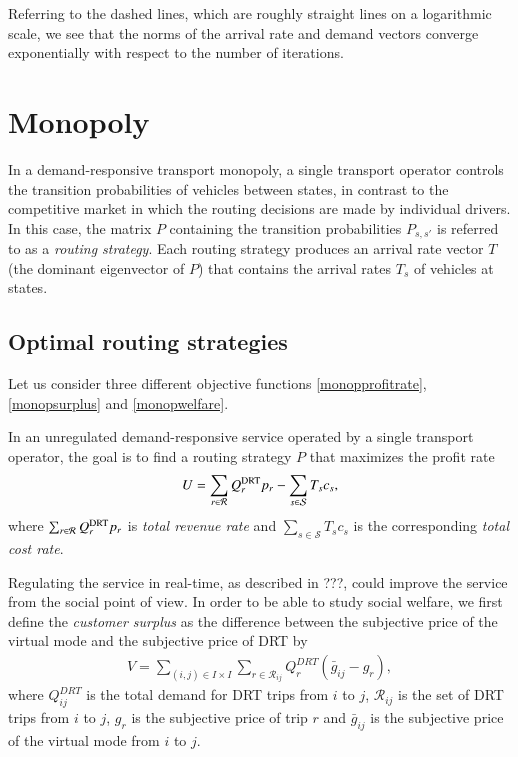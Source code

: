 \documentclass[dissertation,draft*]{aaltoseries}
\begin{document}
Referring to the dashed lines, which are roughly straight lines on a logarithmic scale, 
we see that the norms of the arrival rate and demand vectors converge exponentially
with respect to the number of iterations. 





\section{Monopoly}
\label{monopdescription}
In a demand-responsive transport monopoly, a single transport operator controls the transition probabilities of vehicles
between states, in contrast to the competitive market in which the routing decisions are made by individual drivers.
In this case, the matrix $P$ containing the transition probabilities $P_{s,s'}$ is referred to as a \emph{routing strategy}.
Each routing strategy produces an arrival rate vector $T$ (the dominant eigenvector of $P$) that contains the arrival rates $T_s$ of
vehicles at states.

\subsection{Optimal routing strategies}
Let us consider three different objective functions \eqref{monopprofitrate}, \eqref{monopsurplus} and \eqref{monopwelfare}.

In an unregulated demand-responsive service operated by a single transport operator, 
the goal is to find a routing strategy $P$ that maximizes the profit rate
\begin{align}
\label{monopprofitrate}
U = \sum_{r \in \mathcal{R}}  Q_r^{\rm DRT} p_r - \sum_{s \in \mathcal{S}} T_s c_{s},
\end{align}
where $\sum_{r \in \mathcal{R}}  Q_r^{\rm DRT} p_r$ is \emph{total revenue rate} 
and $\sum_{s \in \mathcal{S}} T_s c_{s}$ is
the corresponding \emph{total cost rate}. 

Regulating the service in real-time, as described in ???, could improve the service
from the social point of view. In order to be able to study social welfare, we first define the \emph{customer surplus}
as the difference between the subjective price of the virtual mode and 
the subjective price of DRT by
\begin{align}
\label{monopsurplus}
V = \sum_{(i,j) \in I \times I} \sum_{r \in \mathcal{R}_{ij}} Q^{DRT}_r  (\bar{g}_{ij}-g_r),
\end{align}
where $Q^{DRT}_{ij}$ is the total demand for DRT trips from $i$ to $j$, $\mathcal{R}_{ij}$
is the set of DRT trips from $i$ to $j$, $g_r$ is the subjective price
of trip $r$ and $\bar{g}_{ij}$ is the subjective price of the virtual mode from $i$ to $j$.
\end{document}
